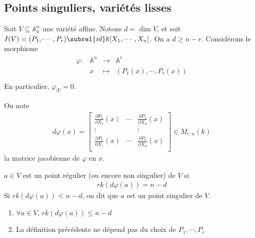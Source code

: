         \subsection{Points singuliers, variétés lisses}
            Soit $V \subseteq \mathbb{A}^n_k$ une variété affine. Notons $d = \dim V$, et soit $I(V) = (P_1, \cdots, P_r) \subrel{id} k[X_1, \cdots, X_n]$. On a $d \geq n - r$. Considérons le morphisme
            \begin{align*}
                \begin{array}{cccc}
                    \varphi : & \mathbb{A}^n & \to & \mathbb{A}^r \\
                    & x & \mapsto & (P_1(x), \cdots, P_r(x)) \\
                \end{array}
            \end{align*}
            En particulier, $\varphi_{|V} = 0$.
            \begin{nota}
                On note
                \begin{align*}
                    d \varphi (x) = 
                    \begin{bmatrix}
                        \frac{\partial P_1}{\partial X_1}(x) & \cdots & \frac{\partial P_1}{\partial X_n}(x) \\
                        \vdots & & \vdots \\
                        \frac{\partial P_r}{\partial X_1}(x) & \cdots & \frac{\partial P_r}{\partial X_n}(x) \\
                    \end{bmatrix}
                    \in M_{r, n}(k)
                \end{align*}
                la matrice jacobienne de $\varphi$ en $x$.
            \end{nota}
            \begin{defi}
                $a \in V$ est un point régulier (ou encore non singulier) de $V$ si 
                \begin{align*}
                    rk (d \varphi(a)) = n - d
                \end{align*}
                Si $rk (d \varphi(a)) < n - d$, on dit que $a$ est un point singulier de $V$.
            \end{defi}
            \begin{remq}
                \begin{enumerate}
                    \item $\forall a \in V$, $rk (d \varphi(a)) \leq n - d$
                    \item La définition précédente ne dépend pas du choix de $P_1, \cdots, P_r$
                \end{enumerate}
            \end{remq}
